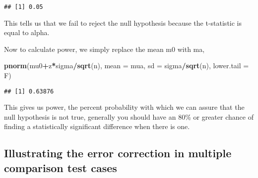 \documentclass[
]{article}
\newenvironment{Shaded}{\begin{snugshade}}{\end{snugshade}}
\newcommand{\CommentTok}[1]{\textcolor[rgb]{0.56,0.35,0.01}{\textit{#1}}}
\newcommand{\ControlFlowTok}[1]{\textcolor[rgb]{0.13,0.29,0.53}{\textbf{#1}}}
\newcommand{\DataTypeTok}[1]{\textcolor[rgb]{0.13,0.29,0.53}{#1}}
\newcommand{\DecValTok}[1]{\textcolor[rgb]{0.00,0.00,0.81}{#1}}
\newcommand{\FloatTok}[1]{\textcolor[rgb]{0.00,0.00,0.81}{#1}}
\newcommand{\KeywordTok}[1]{\textcolor[rgb]{0.13,0.29,0.53}{\textbf{#1}}}
\newcommand{\NormalTok}[1]{#1}
\newcommand{\OperatorTok}[1]{\textcolor[rgb]{0.81,0.36,0.00}{\textbf{#1}}}
\newcommand{\OtherTok}[1]{\textcolor[rgb]{0.56,0.35,0.01}{#1}}
\newcommand{\StringTok}[1]{\textcolor[rgb]{0.31,0.60,0.02}{#1}}
\begin{document}
\begin{verbatim}
## [1] 0.05
\end{verbatim}

This tells us that we fail to reject the null hypothesis because the
t-statistic is equal to alpha.

Now to calculate power, we simply replace the mean m0 with ma,

\begin{Shaded}
\begin{Highlighting}[]
\KeywordTok{pnorm}\NormalTok{(mu0}\OperatorTok{+}\NormalTok{z}\OperatorTok{*}\NormalTok{sigma}\OperatorTok{/}\KeywordTok{sqrt}\NormalTok{(n), }\DataTypeTok{mean =}\NormalTok{ mua, }\DataTypeTok{sd =}\NormalTok{ sigma}\OperatorTok{/}\KeywordTok{sqrt}\NormalTok{(n), }\DataTypeTok{lower.tail =}\NormalTok{ F)}
\end{Highlighting}
\end{Shaded}

\begin{verbatim}
## [1] 0.63876
\end{verbatim}

This gives us power, the percent probability with which we can assure
that the null hypothesis is not true, generally you should have an 80\%
or greater chance of finding a statistically significant difference when
there is one.

\hypertarget{illustrating-the-error-correction-in-multiple-comparison-test-cases}{%
\subsection{Illustrating the error correction in multiple comparison
test
cases}\label{illustrating-the-error-correction-in-multiple-comparison-test-cases}}

\begin{Shaded}
\end{Shaded}
\end{document}
